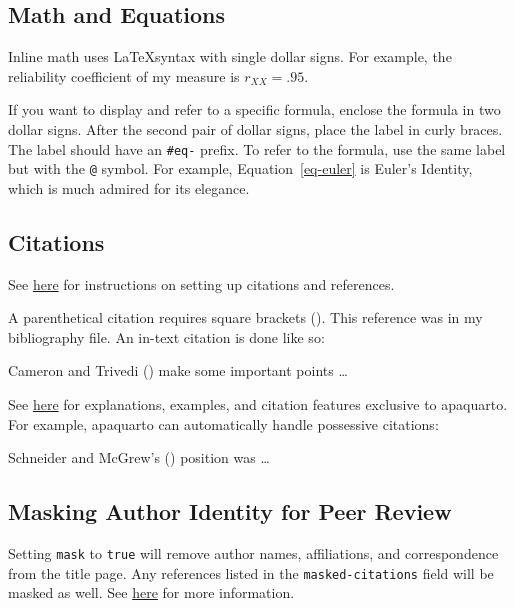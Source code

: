 \documentclass[
  jou,
  floatsintext,
  longtable,
  nolmodern,
  notxfonts,
  notimes,
  colorlinks=true,linkcolor=blue,citecolor=blue,urlcolor=blue]{apa7}
\begin{document}
\subsection{Math and Equations}\label{math-and-equations}

Inline math uses \LaTeX syntax with single dollar signs. For example,
the reliability coefficient of my measure is \(r_{XX}=.95\).

If you want to display and refer to a specific formula, enclose the
formula in two dollar signs. After the second pair of dollar signs,
place the label in curly braces. The label should have an \texttt{\#eq-}
prefix. To refer to the formula, use the same label but with the
\texttt{@} symbol. For example, Equation~\ref{eq-euler} is Euler's
Identity, which is much admired for its elegance.

\subsection{Citations}\label{citations}

See
\href{https://quarto.org/docs/authoring/footnotes-and-citations.html}{here}
for instructions on setting up citations and references.

A parenthetical citation requires square brackets
(). This
reference was in my bibliography file. An in-text citation is done like
so:

Cameron and Trivedi () make some
important points \ldots{}

See
\href{https://wjschne.github.io/apaquarto/writing.html\#references}{here}
for explanations, examples, and citation features exclusive to
apaquarto. For example, apaquarto can automatically handle possessive
citations:

Schneider and McGrew's ()
position was \ldots{}

\subsection{Masking Author Identity for Peer
Review}\label{masking-author-identity-for-peer-review}

Setting \texttt{mask} to \texttt{true} will remove author names,
affiliations, and correspondence from the title page. Any references
listed in the \texttt{masked-citations} field will be masked as well.
See
\href{https://wjschne.github.io/apaquarto/writing.html\#masked-citations-for-anonymous-peer-review}{here}
for more information.
\end{document}
